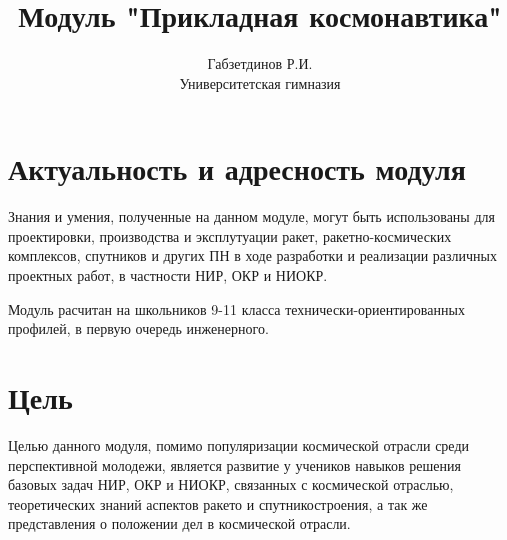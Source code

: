 \documentclass{article}
\title{Модуль "Прикладная космонавтика"}
\author{Габзетдинов Р.И.\\ Университетская гимназия} \date{}
\begin{document}
\maketitle
\large
\setlength{\parindent}{0}
\section{Актуальность и адресность модуля}

Знания и умения, полученные на данном модуле, могут быть использованы для проектировки, производства и эксплутуации ракет, ракетно-космических комплексов, спутников и других ПН в ходе разработки и реализации различных проектных работ, в частности НИР, ОКР и НИОКР.

Модуль расчитан на школьников 9-11 класса технически-ориентированных профилей, в первую очередь инженерного.

\section{Цель}

Целью данного модуля, помимо популяризации космической отрасли среди перспективной молодежи, является развитие у учеников навыков решения базовых задач НИР, ОКР и НИОКР, связанных с космической отраслью, теоретических знаний аспектов ракето и спутникостроения, а так же представления о положении дел в космической отрасли.
\end{document}
